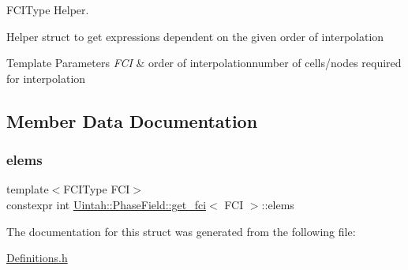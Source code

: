 F\+C\+I\+Type Helper. 

Helper struct to get expressions dependent on the given order of interpolation 
\begin{DoxyTemplParams}{Template Parameters}
{\em F\+CI} & order of interpolationnumber of cells/nodes required for interpolation \\
\hline
\end{DoxyTemplParams}


\subsection{Member Data Documentation}
\mbox{\label{structUintah_1_1PhaseField_1_1get__fci_a8102351252dc32be04622ad879e67cd3}} 
\subsubsection{\texorpdfstring{elems}{elems}}
{\footnotesize\ttfamily template$<$F\+C\+I\+Type F\+CI$>$ \\
constexpr int \hyperlink{structUintah_1_1PhaseField_1_1get__fci}{Uintah\+::\+Phase\+Field\+::get\+\_\+fci}$<$ F\+CI $>$\+::elems\hspace{0.3cm}{\ttfamily [static]}}



The documentation for this struct was generated from the following file\+:\begin{DoxyCompactItemize}
\item 
\hyperlink{Definitions_8h}{Definitions.\+h}\end{DoxyCompactItemize}
